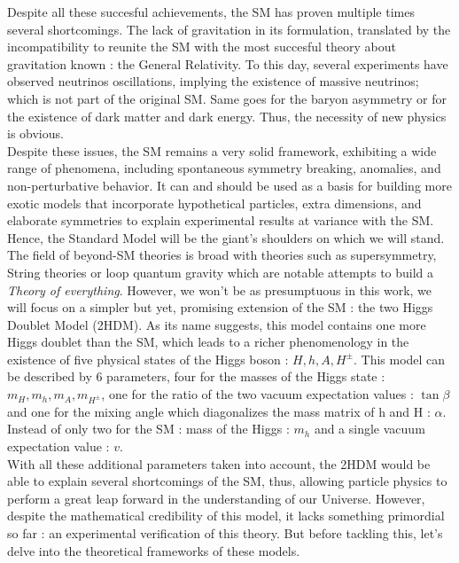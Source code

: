 \documentclass [12pt] {article}
\numberwithin{equation}{section} %
\numberwithin{figure}{section}   %
\begin{document}
Despite all these succesful achievements, the SM has proven multiple times several shortcomings. The lack of gravitation in its formulation, translated by the incompatibility to reunite the SM with the most succesful theory about gravitation known : the General Relativity. To this day, several experiments have observed neutrinos oscillations, implying the existence of massive neutrinos; which is not part of the original SM. Same goes for the baryon asymmetry or for the existence of dark matter and dark energy. Thus, the necessity of new physics is obvious.\\

Despite these issues, the SM remains a very solid framework, exhibiting a wide range of phenomena, including spontaneous symmetry breaking, anomalies, and non-perturbative behavior. It can and should be used as a basis for building more exotic models that incorporate hypothetical particles, extra dimensions, and elaborate symmetries to explain experimental results at variance with the SM. Hence, the Standard Model will be the giant's shoulders on which we will stand.\\

The field of beyond-SM theories is broad with theories such as supersymmetry, String theories or loop quantum gravity which are notable attempts to build a \textit{Theory of everything}. However, we won't be as presumptuous in this work, we will focus on a simpler but yet, promising extension of the SM : the two Higgs Doublet Model (2HDM). As its name suggests, this model contains one more Higgs doublet than the SM, which leads to a richer phenomenology in the existence of five physical states of the Higgs boson : $H, h, A, H^\pm$. This model can be described by 6 parameters, four for the masses of the Higgs state : $m_H, m_h, m_A, m_{H^\pm}$, one for the ratio of the two vacuum expectation values : $\tan \beta$ and one for the mixing angle which diagonalizes the mass matrix of h and H : $\alpha$. Instead of only two for the SM : mass of the Higgs : $m_h$ and a single vacuum expectation value : $v$.\\

With all these additional parameters taken into account, the 2HDM would be able to explain several shortcomings of the SM, thus, allowing particle physics to perform a great leap forward in the understanding of our Universe. However, despite the mathematical credibility of this model, it lacks something primordial so far : an experimental verification of this theory. But before tackling this, let's delve into the theoretical frameworks of these models.
\end{document}
